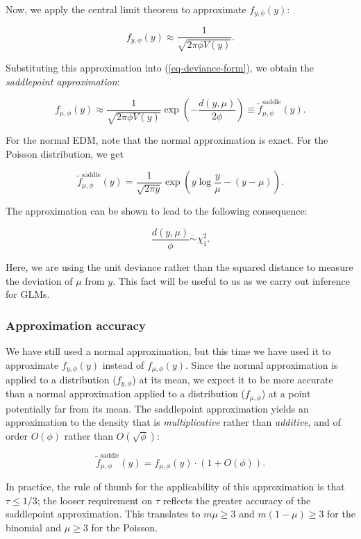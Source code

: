\documentclass[
  11pt,
  letterpaper,
  oneside]{book}
\theoremstyle{definition}
\theoremstyle{plain}
\theoremstyle{plain}
\theoremstyle{plain}
\theoremstyle{remark}
\begin{document}
Now, we apply the central limit theorem to approximate
\(f_{y, \phi}(y)\):

\[
f_{y, \phi}(y) \approx \frac{1}{\sqrt{2\pi \phi V(y)}}.
\]

Substituting this approximation into (\ref{eq-deviance-form}), we obtain
the \emph{saddlepoint approximation}:

\[
f_{\mu, \phi}(y) \approx \frac{1}{\sqrt{2\pi \phi V(y)}}\exp\left(-\frac{d(y, \mu)}{2\phi}\right) \equiv \widetilde f^{\text{saddle}}_{\mu, \phi}(y).
\]

For the normal EDM, note that the normal approximation is exact. For the
Poisson distribution, we get

\[
\widetilde f^{\text{saddle}}_{\mu, \phi}(y) = \frac{1}{\sqrt{2\pi y}}\exp\left(y \log \frac y \mu - (y - \mu)\right).
\]

The approximation can be shown to lead to the following consequence:

\[
\frac{d(y, \mu)}{\phi} \overset \cdot \sim \chi^2_1.
\]

Here, we are using the unit deviance rather than the squared distance to
measure the deviation of \(\mu\) from \(y\). This fact will be useful to
us as we carry out inference for GLMs.

\hypertarget{approximation-accuracy-1}{%
\subsubsection{Approximation accuracy}\label{approximation-accuracy-1}}

We have still used a normal approximation, but this time we have used it
to approximate \(f_{y, \phi}(y)\) instead of \(f_{\mu, \phi}(y)\). Since
the normal approximation is applied to a distribution (\(f_{y, \phi}\))
at its mean, we expect it to be more accurate than a normal
approximation applied to a distribution (\(f_{\mu, \phi}\)) at a point
potentially far from its mean. The saddlepoint approximation yields an
approximation to the density that is \emph{multiplicative} rather than
\emph{additive}, and of order \(O(\phi)\) rather than
\(O(\sqrt{\phi})\):

\[
\tilde f^{\text{saddle}}_{\mu, \phi}(y) = f_{\mu, \phi}(y) \cdot (1 + O(\phi)).
\]

In practice, the rule of thumb for the applicability of this
approximation is that \(\tau \leq 1/3\); the looser requirement on
\(\tau\) reflects the greater accuracy of the saddlepoint approximation.
This translates to \(m\mu \geq 3\) and \(m(1-\mu) \geq 3\) for the
binomial and \(\mu \geq 3\) for the Poisson.
\end{document}
